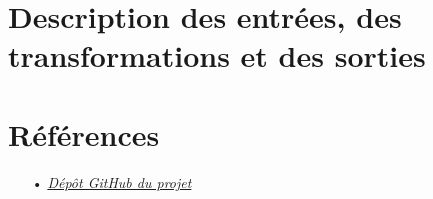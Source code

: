 \documentclass[]{report}
\begin{document}
\begin{doublespace}
\chapter{Description des entrées, des transformations et des sorties}
\fancyhead[R]{\hspace*{5cm}}


\newpage

\appendix
{} \setcounter{page}{1}
\chapter{Références}

\begin{itemize}
  \item[•] \href{https://github.com/abdorah/model-based-architecture-yml-jdl}{\textit{Dépôt GitHub du projet}}
\end{itemize}

\end{doublespace}
\end{document}
